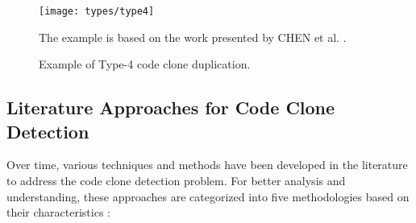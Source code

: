 \begin{figure}
\texttt{[image: types/type4]}
\caption{Example of Type-4 code clone duplication.}
The example is based on the work presented by CHEN et al. \citep{litreview}.
\label{fig:type4}
\end{figure}

\subsection{Literature Approaches for Code Clone Detection}

Over time, various techniques and methods have been developed in the literature
to address the code clone detection problem. For better analysis and
understanding, these approaches are categorized into five methodologies based
on their characteristics \citep{litreview}:

